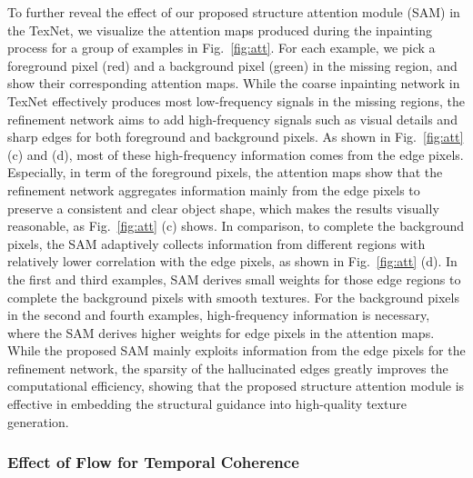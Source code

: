 To further reveal the effect of our proposed structure attention module (SAM) in the TexNet, we visualize the attention maps produced during the inpainting process for a group of examples in Fig.~\ref{fig:att}.
For each example, we pick a foreground pixel (red) and a background pixel (green) in the missing region, and show their corresponding attention maps.
%
While the coarse inpainting network in TexNet effectively produces most low-frequency signals in the missing regions, the refinement network aims to add high-frequency signals such as visual details and sharp edges for both foreground and background pixels.
%
As shown in Fig.~\ref{fig:att} (c) and (d), most of these high-frequency information comes from the edge pixels.
%
Especially, in term of the foreground pixels, the attention maps show that the refinement network aggregates information mainly from the edge pixels to preserve a consistent and clear object shape, which makes the results visually reasonable, as Fig.~\ref{fig:att} (c) shows.
In comparison, to complete the background pixels, the SAM adaptively collects information from different regions with relatively lower correlation with the edge pixels, as shown in Fig.~\ref{fig:att} (d).
%
In the first and third examples, SAM derives small weights for those edge regions to complete the background pixels with smooth textures. 
For the background pixels in the second and fourth examples, high-frequency information is necessary, where the SAM derives higher weights for edge pixels in the attention maps.  
%
While the proposed SAM mainly exploits information from the edge pixels for the refinement network, the sparsity of the hallucinated edges greatly improves the computational efficiency, showing that the proposed structure attention module is effective in embedding the structural guidance into high-quality texture generation.








\subsubsection{Effect of Flow for Temporal Coherence}

